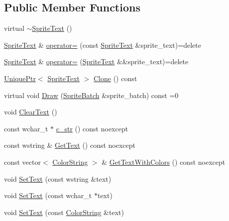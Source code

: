 \subsection*{Public Member Functions}
\begin{DoxyCompactItemize}
\item 
virtual \hyperlink{classmage_1_1_sprite_text_aa30d68a79775dce902c190f2cd298bb4}{$\sim$\+Sprite\+Text} ()
\item 
\hyperlink{classmage_1_1_sprite_text}{Sprite\+Text} \& \hyperlink{classmage_1_1_sprite_text_af027a281c1fa600dd870ca04d91fcae8}{operator=} (const \hyperlink{classmage_1_1_sprite_text}{Sprite\+Text} \&sprite\+\_\+text)=delete
\item 
\hyperlink{classmage_1_1_sprite_text}{Sprite\+Text} \& \hyperlink{classmage_1_1_sprite_text_a7e2e165d7682d9cc623b7c9725f76920}{operator=} (\hyperlink{classmage_1_1_sprite_text}{Sprite\+Text} \&\&sprite\+\_\+text)=delete
\item 
\hyperlink{namespacemage_a3316d7143a973e37adf1110f2e80ca31}{Unique\+Ptr}$<$ \hyperlink{classmage_1_1_sprite_text}{Sprite\+Text} $>$ \hyperlink{classmage_1_1_sprite_text_ad76e6d91e59f5070152104da8af1aa4e}{Clone} () const
\item 
virtual void \hyperlink{classmage_1_1_sprite_text_a45d5ac8410d5a46b26e8491946a2ad9e}{Draw} (\hyperlink{classmage_1_1_sprite_batch}{Sprite\+Batch} \&sprite\+\_\+batch) const =0
\item 
void \hyperlink{classmage_1_1_sprite_text_a73c5a10e846e94f2f79a25a78bf2e6d0}{Clear\+Text} ()
\item 
const wchar\+\_\+t $\ast$ \hyperlink{classmage_1_1_sprite_text_a236e243b8832cb6e32b1341e798d25bb}{c\+\_\+str} () const noexcept
\item 
const wstring \& \hyperlink{classmage_1_1_sprite_text_adf93f6290fb55685aee478255e88792e}{Get\+Text} () const noexcept
\item 
const vector$<$ \hyperlink{classmage_1_1_color_string}{Color\+String} $>$ \& \hyperlink{classmage_1_1_sprite_text_a2493ad5e9a8c472dae8beb92f51dc882}{Get\+Text\+With\+Colors} () const noexcept
\item 
void \hyperlink{classmage_1_1_sprite_text_ac33e512ab29554a306ada9a378ab00eb}{Set\+Text} (const wstring \&text)
\item 
void \hyperlink{classmage_1_1_sprite_text_a03d5012e2812d422a1285a4a0abb104f}{Set\+Text} (const wchar\+\_\+t $\ast$text)
\item 
void \hyperlink{classmage_1_1_sprite_text_a3ca23b77ab252f226d6525dfc2cb3d11}{Set\+Text} (const \hyperlink{classmage_1_1_color_string}{Color\+String} \&text)

\end{DoxyCompactItemize}
